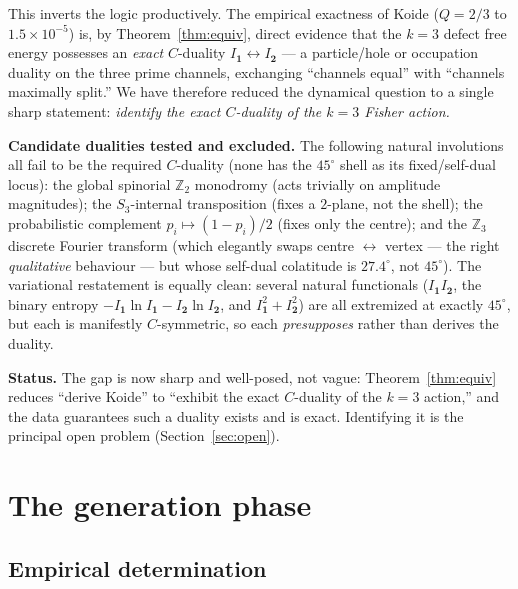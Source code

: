 \documentclass[12pt]{article}
\theoremstyle{definition}
\theoremstyle{remark}
\begin{document}
This inverts the logic productively. The empirical exactness of Koide
($Q=2/3$ to $1.5\times10^{-5}$) is, by Theorem~\ref{thm:equiv}, direct
evidence that the $k=3$ defect free energy possesses an \emph{exact}
$C$-duality $I_{\mathbf 1}\leftrightarrow I_{\mathbf 2}$ --- a particle/hole or
occupation duality on the three prime channels, exchanging ``channels equal''
with ``channels maximally split.'' We have therefore reduced the dynamical
question to a single sharp statement: \emph{identify the exact
$C$-duality of the $k=3$ Fisher action.}

\medskip\noindent\textbf{Candidate dualities tested and excluded.} The
following natural involutions all fail to be the required $C$-duality (none has
the $45^\circ$ shell as its fixed/self-dual locus): the global spinorial
$\mathbb{Z}_2$ monodromy (acts trivially on amplitude magnitudes); the
$S_3$-internal transposition (fixes a $2$-plane, not the shell); the
probabilistic complement $p_i\mapsto(1-p_i)/2$ (fixes only the centre); and the
$\mathbb{Z}_3$ discrete Fourier transform (which elegantly swaps centre
$\leftrightarrow$ vertex --- the right \emph{qualitative} behaviour --- but
whose self-dual colatitude is $27.4^\circ$, not $45^\circ$). The variational
restatement is equally clean: several natural functionals ($I_{\mathbf 1}
I_{\mathbf 2}$, the binary entropy $-I_{\mathbf 1}\ln I_{\mathbf 1}
-I_{\mathbf 2}\ln I_{\mathbf 2}$, and $I_{\mathbf 1}^2+I_{\mathbf 2}^2$) are
all extremized at exactly $45^\circ$, but each is manifestly $C$-symmetric, so
each \emph{presupposes} rather than derives the duality.

\medskip\noindent\textbf{Status.} The gap is now sharp and well-posed, not
vague: Theorem~\ref{thm:equiv} reduces ``derive Koide'' to ``exhibit the exact
$C$-duality of the $k=3$ action,'' and the data guarantees such a duality
exists and is exact. Identifying it is the principal open problem
(Section~\ref{sec:open}).

\section{The generation phase}
\label{sec:phase}

\subsection{Empirical determination}
\end{document}
